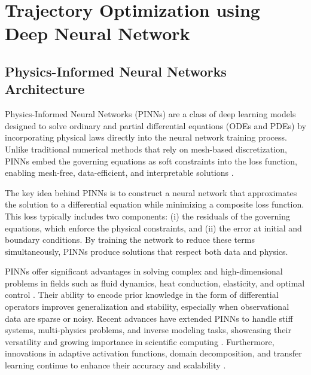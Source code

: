 \chapter{Trajectory Optimization using Deep Neural Network}

\ifpdf
    \graphicspath{{Chapter3/Figs/Raster/}{Chapter3/Figs/PDF/}{Chapter3/Figs/}}
\else
    \graphicspath{{Chapter3/Figs/Vector/}{Chapter3/Figs/}}
\fi



\section{Physics-Informed Neural Networks Architecture}

Physics-Informed Neural Networks (PINNs) are a class of deep learning models designed to solve ordinary and partial differential equations (ODEs and PDEs) by incorporating physical laws directly into the neural network training process. Unlike traditional numerical methods that rely on mesh-based discretization, PINNs embed the governing equations as soft constraints into the loss function, enabling mesh-free, data-efficient, and interpretable solutions \cite{raissi2019physics,karniadakis2021physics}.

The key idea behind PINNs is to construct a neural network that approximates the solution to a differential equation while minimizing a composite loss function. This loss typically includes two components: (i) the residuals of the governing equations, which enforce the physical constraints, and (ii) the error at initial and boundary conditions. By training the network to reduce these terms simultaneously, PINNs produce solutions that respect both data and physics.

PINNs offer significant advantages in solving complex and high-dimensional problems in fields such as fluid dynamics, heat conduction, elasticity, and optimal control \cite{cuomo2022scientific}. Their ability to encode prior knowledge in the form of differential operators improves generalization and stability, especially when observational data are sparse or noisy. Recent advances have extended PINNs to handle stiff systems, multi-physics problems, and inverse modeling tasks, showcasing their versatility and growing importance in scientific computing \cite{wang2021understanding,mao2020physics}. Furthermore, innovations in adaptive activation functions, domain decomposition, and transfer learning continue to enhance their accuracy and scalability \cite{mcclenny2020self,shukla2021parallel}.

